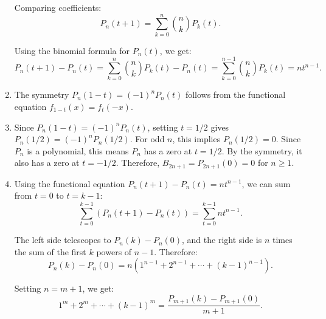 \begin{enumerate}[label=(\alph*)]
Comparing coefficients:
\[P_n(t+1) = \sum_{k=0}^n \binom{n}{k} P_k(t).\]

Using the binomial formula for \( P_n(t) \), we get:
\[P_n(t+1) - P_n(t) = \sum_{k=0}^n \binom{n}{k} P_k(t) - P_n(t) = \sum_{k=0}^{n-1} \binom{n}{k} P_k(t) = nt^{n-1}.\]

\item The symmetry \( P_n(1-t) = (-1)^n P_n(t) \) follows from the functional equation \( f_{1-t}(x) = f_t(-x) \).

\item Since \( P_n(1-t) = (-1)^n P_n(t) \), setting \( t = 1/2 \) gives \( P_n(1/2) = (-1)^n P_n(1/2) \). For odd \( n \), this implies \( P_n(1/2) = 0 \). Since \( P_n \) is a polynomial, this means \( P_n \) has a zero at \( t = 1/2 \). By the symmetry, it also has a zero at \( t = -1/2 \). Therefore, \( B_{2n+1} = P_{2n+1}(0) = 0 \) for \( n \geq 1 \).

\item Using the functional equation \( P_n(t+1) - P_n(t) = nt^{n-1} \), we can sum from \( t = 0 \) to \( t = k-1 \):
\[\sum_{t=0}^{k-1} (P_n(t+1) - P_n(t)) = \sum_{t=0}^{k-1} nt^{n-1}.\]

The left side telescopes to \( P_n(k) - P_n(0) \), and the right side is \( n \) times the sum of the first \( k \) powers of \( n-1 \). Therefore:
\[P_n(k) - P_n(0) = n(1^{n-1} + 2^{n-1} + \cdots + (k-1)^{n-1}).\]

Setting \( n = m+1 \), we get:
\[1^m + 2^m + \cdots + (k-1)^m = \frac{P_{m+1}(k) - P_{m+1}(0)}{m+1}.\]
\end{enumerate}